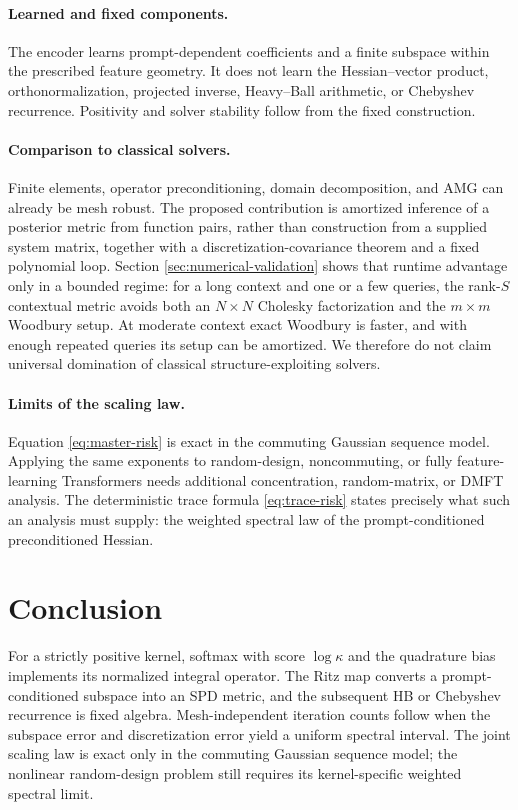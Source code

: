 \documentclass[11pt,a4paper]{article}
\numberwithin{equation}{section}
\theoremstyle{definition}
\theoremstyle{remark}
\begin{document}
\paragraph{Learned and fixed components.}
The encoder learns prompt-dependent coefficients and a finite subspace within
the prescribed feature geometry.  It does not learn the Hessian--vector
product, orthonormalization, projected inverse, Heavy--Ball arithmetic, or
Chebyshev recurrence. Positivity and solver stability follow from the fixed
construction.

\paragraph{Comparison to classical solvers.}
Finite elements, operator preconditioning, domain decomposition, and AMG can
already be mesh robust. The proposed contribution is amortized inference of a
posterior metric from function pairs, rather than construction from a supplied
system matrix, together with a discretization-covariance theorem and a fixed
polynomial loop. Section
\ref{sec:numerical-validation} shows that runtime advantage only in a bounded
regime: for a long context and one or a few queries, the rank-$S$ contextual
metric avoids both an $N\times N$ Cholesky factorization and the
$m\times m$ Woodbury setup.  At moderate context exact Woodbury is faster, and
with enough repeated queries its setup can be amortized.  We therefore do not
claim universal domination of classical structure-exploiting solvers.

\paragraph{Limits of the scaling law.}
Equation \eqref{eq:master-risk} is exact in the commuting Gaussian sequence
model.  Applying the same exponents to random-design, noncommuting, or fully
feature-learning Transformers needs additional concentration, random-matrix,
or DMFT analysis.  The deterministic trace formula
\eqref{eq:trace-risk} states precisely what such an analysis must supply: the
weighted spectral law of the prompt-conditioned preconditioned Hessian.

\clearpage
\section{Conclusion}

For a strictly positive kernel, softmax with score \(\log\kappa\) and the
quadrature bias implements its normalized integral operator. The Ritz map
converts a prompt-conditioned subspace into an SPD metric, and the subsequent
HB or Chebyshev recurrence is fixed algebra. Mesh-independent iteration counts
follow when the subspace error and discretization error yield a uniform
spectral interval. The joint scaling law is exact only in the commuting
Gaussian sequence model; the nonlinear random-design problem still requires
its kernel-specific weighted spectral limit.
\end{document}
